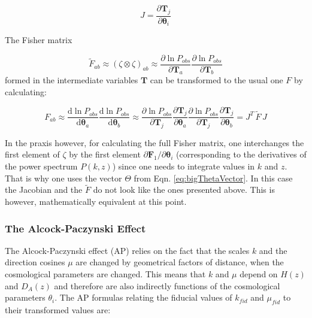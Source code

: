 \begin{equation}
J=\frac{\partial\mathbf{T}_{j}}{\partial\boldsymbol{\theta}_{i}}\label{eq:jacobian}
\end{equation}


The Fisher matrix 

\begin{equation}
\tilde{F}_{ab}\approx(\zeta\otimes\zeta)_{ab}\approx\frac{\partial\ln P_{obs}}{\partial\mathbf{T}{}_{a}}\frac{\partial\ln P_{obs}}{\partial\mathbf{T}{}_{b}}
\end{equation}
formed in the intermediate variables $\boldsymbol{T}$ can be transformed
to the usual one $F$ by calculating:

\begin{equation}
F_{ab}\approx\frac{\mbox{d}\ln P_{obs}}{\mbox{d}\boldsymbol{\theta}{}_{a}}\frac{\mbox{d}\ln P_{obs}}{\mbox{d}\boldsymbol{\theta}{}_{b}}\approx\frac{\partial\ln P_{obs}}{\partial\mathbf{T}{}_{j}}\frac{\partial\mathbf{T}_{j}}{\partial\boldsymbol{\theta}_{a}}\frac{\partial\ln P_{obs}}{\partial\mathbf{T}{}_{j}}\frac{\partial\mathbf{T}_{j}}{\partial\boldsymbol{\theta}_{b}}=J^{T}\,\tilde{F}\,J
\end{equation}


In the praxis however, for calculating the full Fisher matrix, one
interchanges the first element of $\zeta$ by the first element $\partial\boldsymbol{F}_{1}/\partial\boldsymbol{\theta}_{i}$
(corresponding to the derivatives of the power spectrum $P(k,z)$)
since one needs to integrate values in $k$ and $z$. That is why
one uses the vector $\Theta$ from Eqn. \ref{eq:bigThetaVector}.
In this case the Jacobian and the $\tilde{F}$ do not look like the
ones presented above. This is however, mathematically equivalent at
this point.


\subsubsection{The Alcock-Paczynski Effect\label{sub:The-Alcock-Paczynski-Effect}}

The Alcock-Paczynski effect (AP) relies on the fact that the scales
$k$ and the direction cosines $\mu$ are changed by geometrical factors
of distance, when the cosmological parameters are changed. This means
that $k$ and $\mu$ depend on $H(z)$ and $D_{A}(z)$ and therefore
are also indirectly functions of the cosmological parameters $\theta_{i}$.
The AP formulas relating the fiducial values of $k_{fid}$ and $\mu_{fid}$
to their transformed values are:

